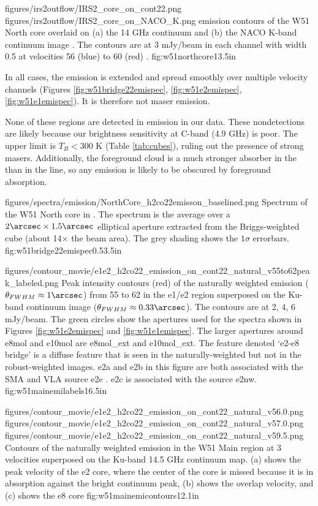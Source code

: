 \FigureTwo
{figures/irs2outflow/IRS2_core_on_cont22.png}
{figures/irs2outflow/IRS2_core_on_NACO_K.png}
{\formaldehyde \twotwo emission contours of the W51 North core
overlaid on (a) the 14 GHz continuum and (b) the NACO K-band continuum image
\citep{Barbosa2008a}.  The contours are at 3 mJy/beam in each channel with
width 0.5 \kms at velocities 56 (blue) to 60 (red) \kms.
}
{fig:w51northcore}{1}{3.5in}

In all cases, the emission is extended and spread smoothly over multiple
velocity channels (Figures 
\ref{fig:w51bridge22emispec}, \ref{fig:w51e2emispec}, \ref{fig:w51e1emispec}).
It is therefore not maser emission.

None of these regions are detected in \oneone emission in our data.  These
nondetections are likely because our brightness sensitivity at C-band (4.9 GHz)
is poor.  The upper limit is $T_B<300$ K (Table \ref{tab:cubes}), ruling
out the presence of strong masers.  Additionally, the foreground cloud is a
much stronger absorber in the \oneone than in the \twotwo line, so any emission
is likely to be obscured by foreground absorption.


\Figure
{figures/spectra/emission/NorthCore_h2co22emisson_baselined.png}
{Spectrum of the W51 North core in \ortho \twotwo.  The spectrum
is the average over a $2\arcsec\times1.5\arcsec$ elliptical aperture extracted
from the Briggs-weighted cube (about 14$\times$ the beam area).  The grey
shading shows the $1\sigma$
errorbars.
}
{fig:w51bridge22emispec}{0.5}{3.5in}

\Figure
{figures/contour_movie/e1e2_h2co22_emission_on_cont22_natural_v55to62peak_labeled.png}
{ Peak intensity contours (red) of the naturally weighted \formaldehyde \twotwo
emission ($\theta_{FWHM}\approx1\arcsec$) from 55 to 62 \kms in the e1/e2
region superposed on the Ku-band continuum image
($\theta_{FWHM}\approx0.33\arcsec$).  The contours are at 2, 4, 6
mJy/beam.  The green circles show
the apertures used for the spectra shown in Figures
\ref{fig:w51e2emispec} and
\ref{fig:w51e1emispec}.  The larger apertures around e8mol and e10mol are
e8mol\_ext and e10mol\_ext.  The feature denoted `e2-e8 bridge' is a diffuse
feature that is seen in the naturally-weighted but not in the robust-weighted
images.  e2a and e2b in this figure are both associated with
the SMA and VLA source e2e \citep{Shi2010a,Goddi2016a}.  e2c is associated with
the source e2nw.
}{fig:w51mainemilabels}{1}{6.5in}

\FigureThreeAA
{figures/contour_movie/e1e2_h2co22_emission_on_cont22_natural_v56.0.png}
{figures/contour_movie/e1e2_h2co22_emission_on_cont22_natural_v57.0.png}
{figures/contour_movie/e1e2_h2co22_emission_on_cont22_natural_v59.5.png}
{Contours of the \formaldehyde \twotwo naturally weighted emission in the W51
Main region at 3 velocities superposed on the Ku-band 14.5 GHz continuum map.
(a) shows the peak velocity of the e2 core, where the center of the core is
missed because it is
in absorption against the bright continuum peak, (b) shows the overlap
velocity, and
(c) shows the e8 core}
{fig:w51mainemicontours}{1}{2.1in}

